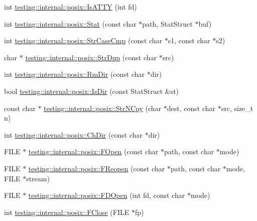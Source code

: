 \begin{DoxyCompactItemize}
\item 
int \hyperlink{namespacetesting_1_1internal_1_1posix_a16ebe936b3a8ea462a94191635aedc27}{testing\-::internal\-::posix\-::\-Is\-A\-T\-T\-Y} (int fd)
\item 
int \hyperlink{namespacetesting_1_1internal_1_1posix_a2b87b7ff647a128614daf50667eb9304}{testing\-::internal\-::posix\-::\-Stat} (const char $\ast$path, Stat\-Struct $\ast$buf)
\item 
int \hyperlink{namespacetesting_1_1internal_1_1posix_a1ef2385a7f8e4c706054da35967e76bd}{testing\-::internal\-::posix\-::\-Str\-Case\-Cmp} (const char $\ast$s1, const char $\ast$s2)
\item 
char $\ast$ \hyperlink{namespacetesting_1_1internal_1_1posix_a5c0864ea9d81d27332b9133e35cbc43c}{testing\-::internal\-::posix\-::\-Str\-Dup} (const char $\ast$src)
\item 
int \hyperlink{namespacetesting_1_1internal_1_1posix_acbad5d4ea5b73fd1765f5f760642932a}{testing\-::internal\-::posix\-::\-Rm\-Dir} (const char $\ast$dir)
\item 
bool \hyperlink{namespacetesting_1_1internal_1_1posix_af0d04ed5baeed28353fa38742748a421}{testing\-::internal\-::posix\-::\-Is\-Dir} (const Stat\-Struct \&st)
\item 
const char $\ast$ \hyperlink{namespacetesting_1_1internal_1_1posix_a3defc980438fce16cf5320a458ccea17}{testing\-::internal\-::posix\-::\-Str\-N\-Cpy} (char $\ast$dest, const char $\ast$src, size\-\_\-t n)
\item 
int \hyperlink{namespacetesting_1_1internal_1_1posix_a1ddc8a4fc6bb21da372307485591a212}{testing\-::internal\-::posix\-::\-Ch\-Dir} (const char $\ast$dir)
\item 
F\-I\-L\-E $\ast$ \hyperlink{namespacetesting_1_1internal_1_1posix_affa05d06d3e3b1ce975935cb0eac4fa7}{testing\-::internal\-::posix\-::\-F\-Open} (const char $\ast$path, const char $\ast$mode)
\item 
F\-I\-L\-E $\ast$ \hyperlink{namespacetesting_1_1internal_1_1posix_a7428e40e37fc1798e36804eafc11680b}{testing\-::internal\-::posix\-::\-F\-Reopen} (const char $\ast$path, const char $\ast$mode, F\-I\-L\-E $\ast$stream)
\item 
F\-I\-L\-E $\ast$ \hyperlink{namespacetesting_1_1internal_1_1posix_a78eb38374e5a5c87ab0cbb30583627f7}{testing\-::internal\-::posix\-::\-F\-D\-Open} (int fd, const char $\ast$mode)
\item 
int \hyperlink{namespacetesting_1_1internal_1_1posix_af4beeaaa8d62916d5e3b644a1ddfbd6b}{testing\-::internal\-::posix\-::\-F\-Close} (F\-I\-L\-E $\ast$fp)

\end{DoxyCompactItemize}
